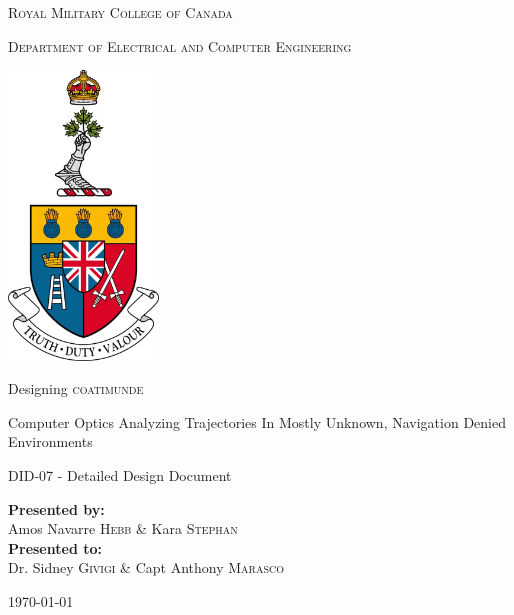 \documentclass{article}[12]
\begin{document}
	
\begin{titlepage}
	\begin{center}
		\vspace*{1cm}
		
		\LARGE\textsc{Royal Military College of Canada}\normalsize
		
		\vspace{0.2cm}
		
		\textsc{Department of Electrical and Computer Engineering}
		
		\vspace{1.5cm}
		
		\includegraphics[width=0.3\textwidth]{rmcLogo.png}
		
		\vspace{1.5cm}
		
		\LARGE{Designing \textsc{coatimunde}\\}
		
		\vspace{0.2cm}
		
		\normalsize{Computer Optics Analyzing Trajectories In Mostly Unknown, Navigation Denied Environments}
		
		\vspace{0.1cm}
		
		\normalsize{DID-07 - Detailed Design Document}
		
		\vfill
		
		\textbf{Presented by:}\\Amos Navarre \textsc{Hebb} \& Kara \textsc{Stephan}\\
		\vspace{0.8cm}
		\textbf{Presented to:}\\Dr. Sidney \textsc{Givigi} \& Capt Anthony \textsc{Marasco} 
		\vspace{0.8cm}
		
		\today
		
	\end{center}
\end{titlepage}
\end{document}
